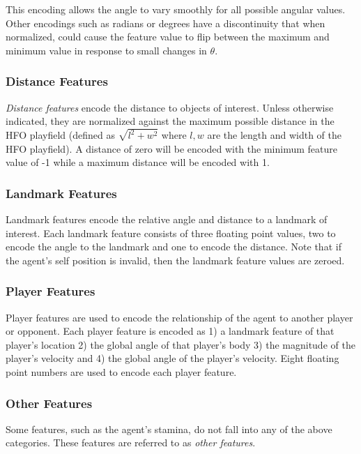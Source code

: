 \documentclass[12pt]{article}
\begin{document}
This encoding allows the angle to vary smoothly for all possible
angular values. Other encodings such as radians or degrees have a
discontinuity that when normalized, could cause the feature value to
flip between the maximum and minimum value in response to small
changes in $\theta$.

\subsubsection{Distance Features}

\textit{Distance features} encode the distance to objects of
interest. Unless otherwise indicated, they are normalized against the
maximum possible distance in the HFO playfield (defined as $\sqrt{l^2
  + w^2}$ where $l,w$ are the length and width of the HFO
playfield). A distance of zero will be encoded with the minimum
feature value of -1 while a maximum distance will be encoded with 1.

\subsubsection{Landmark Features}

Landmark features encode the relative angle and distance to a landmark
of interest. Each landmark feature consists of three floating point
values, two to encode the angle to the landmark and one to encode the
distance. Note that if the agent's self position is invalid, then the
landmark feature values are zeroed.

\subsubsection{Player Features}

Player features are used to encode the relationship of the agent to
another player or opponent. Each player feature is encoded as 1) a
landmark feature of that player's location 2) the global angle of that
player's body 3) the magnitude of the player's velocity and 4) the
global angle of the player's velocity. Eight floating point numbers
are used to encode each player feature.

\subsubsection{Other Features}

Some features, such as the agent's stamina, do not fall into any of
the above categories. These features are referred to as \textit{other
  features}.
\end{document}
